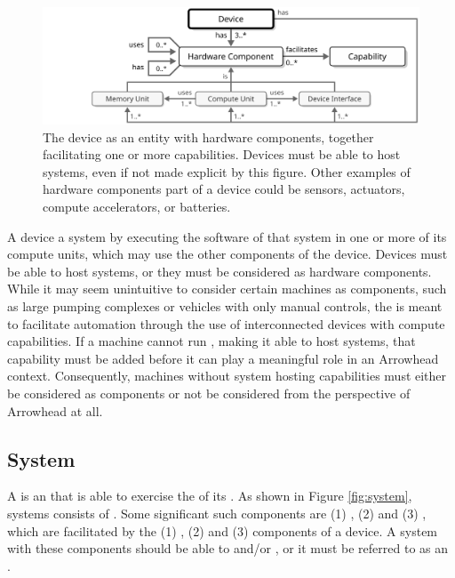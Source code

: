 \begin{figure}[ht!]
  \centering
  \includegraphics[scale=0.9]{figures/device}
  \caption{
    The device as an entity with hardware components, together facilitating one or more capabilities.
    Devices must be able to host systems, even if not made explicit by this figure.
    Other examples of hardware components part of a device could be sensors, actuators, compute accelerators, or batteries.
  }
  \label{fig:device}
\end{figure}

A device  a system by executing the software of that system in one or more of its compute units, which may use the other components of the device.
Devices must be able to host systems, or they must be considered as hardware components.
While it may seem unintuitive to consider certain machines as components, such as large pumping complexes or vehicles with only manual controls, the  is meant to facilitate automation through the use of interconnected devices with compute capabilities.
If a machine cannot run , making it able to host systems, that capability must be added before it can play a meaningful role in an Arrowhead context.
Consequently, machines without system hosting capabilities must either be considered as components or not be considered from the perspective of Arrowhead at all.

\subsection{System}
\label{sec:concepts:system}

A  is an   that is able to exercise the  of its  .
As shown in Figure \ref{fig:system}, systems consists of .
Some significant such components are (1) , (2)  and (3) , which are facilitated by the (1) , (2)  and (3)  components of a device.
A system with these components should be able to  and/or  , or it must be referred to as an .

